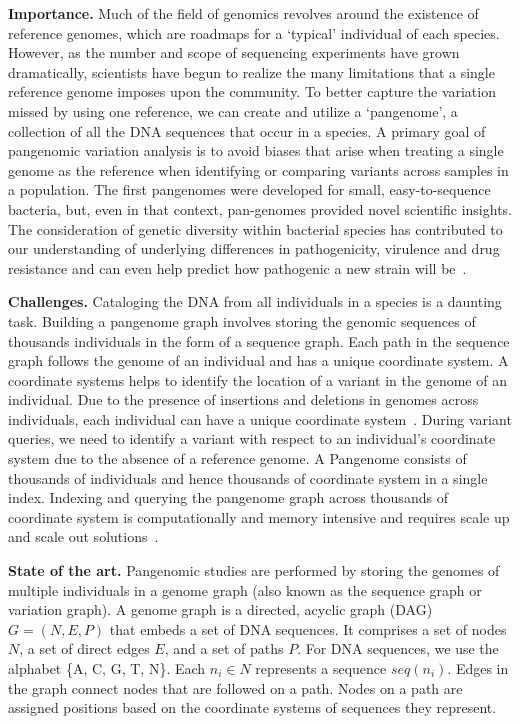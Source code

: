 \noindent
\textbf{Importance.}
Much of the field of genomics revolves around the existence of reference genomes, which are roadmaps for a ‘typical’ individual of each species.  However, as the number and scope of sequencing experiments have grown dramatically, scientists have begun to realize the many limitations that a single reference genome imposes upon the community. To better capture the variation missed by using one reference, we can create and utilize a ‘pangenome’, a collection of all the DNA sequences that occur in a species.
A primary goal of pangenomic variation analysis is to avoid biases that arise when treating a single genome as the reference when identifying or comparing variants across samples in a population. 
The first pangenomes were developed for small, easy-to-sequence bacteria, but, even in that context, pan-genomes provided novel scientific insights. The consideration of genetic diversity within bacterial species has contributed to our understanding of underlying differences in pathogenicity, virulence and drug resistance and can even help predict how pathogenic a new strain will be~\cite{sherman2020pan}.

\noindent
\textbf{Challenges.}
Cataloging the DNA from all individuals in a species is a daunting task.
Building a pangenome graph involves storing the genomic sequences of thousands individuals in the form of a sequence graph. Each path in the sequence graph follows the genome of an individual and has a unique coordinate system. A coordinate systems helps to identify the location of a variant in the genome of an individual. Due to the presence of insertions and deletions in genomes across individuals, each individual can have a unique coordinate system~\cite{pandey2021variantstore}.
During variant queries, we need to identify a variant with respect to an individual's coordinate system due to the absence of a reference genome.
A Pangenome consists of thousands of individuals and hence thousands of coordinate system in a single index. Indexing and querying the pangenome graph across thousands of coordinate system is computationally and memory intensive and requires scale up and scale out solutions~\cite{garrison2018variation,pandey2021variantstore}.

\noindent
\textbf{State of the art.}
Pangenomic studies are performed by storing the genomes of multiple individuals in a genome graph (also known as the sequence graph or variation graph). A genome graph is a directed, acyclic graph (DAG) $G = (N, E, P)$ that embeds a set of DNA sequences. It comprises a set of nodes $N$, a set of direct edges $E$, and a set of paths $P$. For DNA sequences, we use the alphabet \{A, C, G, T, N\}\@. Each $n_i \in N$ represents a sequence $seq(n_i)$. Edges in the graph connect nodes that are followed on a path. Nodes on a path are assigned positions based on the coordinate systems of sequences they represent.

